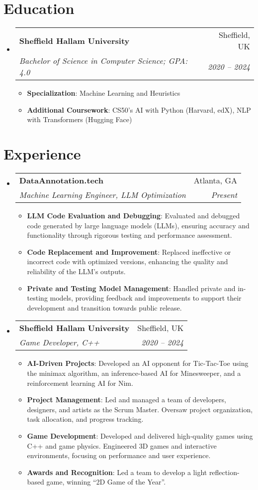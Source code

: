 \documentclass[letterpaper,11pt]{article}
\makeatletter
\newcommand{\resumeItem}[2]{
  \item\small{
    \textbf{#1}{: #2 \vspace{-2pt}}
  }
}
\newcommand{\resumeSubheading}[4]{
  \vspace{-1pt}\item
    \begin{tabular*}{0.97\textwidth}{l@{\extracolsep{\fill}}r}
      \textbf{#1} & #2 \\
      \textit{\small#3} & \textit{\small #4} \\
    \end{tabular*}\vspace{-5pt}
}
\newcommand{\resumeSubHeadingListStart}{\begin{itemize}[leftmargin=*, itemsep=0pt]}
\newcommand{\resumeSubHeadingListEnd}{\end{itemize}}
\newcommand{\resumeItemListStart}{\begin{itemize}[itemsep=0pt]}
\newcommand{\resumeItemListEnd}{\end{itemize}\vspace{-5pt}}
\makeatother
\begin{document}
\vspace{-0.5cm} %


\section{Education}
 \resumeSubHeadingListStart
    \resumeSubheading
      {Sheffield Hallam University}{Sheffield, UK}
      {Bachelor of Science in Computer Science; GPA: 4.0}{2020 -- 2024}
      \resumeItemListStart
        \resumeItem{Specialization}
          {Machine Learning and Heuristics}
        \resumeItem{Additional Coursework}
          {CS50's AI with Python (Harvard, edX), NLP with Transformers (Hugging Face)}
      \resumeItemListEnd
  \resumeSubHeadingListEnd
\vspace{-0.5cm} %



\section{Experience}
 \resumeSubHeadingListStart
    \resumeSubheading
      {DataAnnotation.tech}{Atlanta, GA}
      {Machine Learning Engineer, LLM Optimization}{Present}
      \resumeItemListStart
        \resumeItem{LLM Code Evaluation and Debugging}
          {Evaluated and debugged code generated by large language models (LLMs), ensuring accuracy and functionality through rigorous testing and performance assessment.}
        \resumeItem{Code Replacement and Improvement}
          {Replaced ineffective or incorrect code with optimized versions, enhancing the quality and reliability of the LLM’s outputs.}
        \resumeItem{Private and Testing Model Management}
          {Handled private and in-testing models, providing feedback and improvements to support their development and transition towards public release.}
      \resumeItemListEnd


    \resumeSubheading
      {Sheffield Hallam University}{Sheffield, UK}
      {Game Developer, C++}{2020 -- 2024}
      \resumeItemListStart
        \resumeItem{AI-Driven Projects}
          {Developed an AI opponent for Tic-Tac-Toe using the minimax algorithm, an inference-based AI for Minesweeper, and a reinforcement learning AI for Nim.}
        \resumeItem{Project Management}
          {Led and managed a team of developers, designers, and artists as the Scrum Master. Oversaw project organization, task allocation, and progress tracking.}
        \resumeItem{Game Development}
          {Developed and delivered high-quality games using C++ and game physics. Engineered 3D games and interactive environments, focusing on performance and user experience.}
        \resumeItem{Awards and Recognition}
          {Led a team to develop a light reflection-based game, winning “2D Game of the Year”.}
      \resumeItemListEnd
  \resumeSubHeadingListEnd
\vspace{-1cm} %
\end{document}
